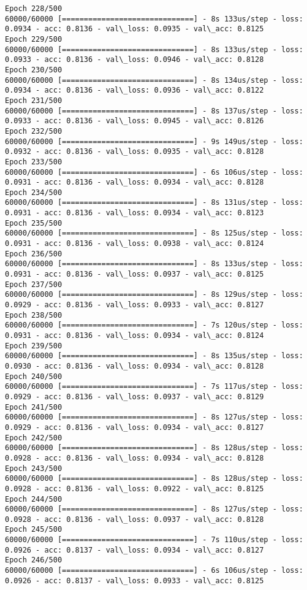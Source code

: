 \documentclass[11pt]{article}
\begin{document}
\begin{Verbatim}[commandchars=\\\{\}]
Epoch 228/500
60000/60000 [==============================] - 8s 133us/step - loss: 0.0934 - acc: 0.8136 - val\_loss: 0.0935 - val\_acc: 0.8125
Epoch 229/500
60000/60000 [==============================] - 8s 133us/step - loss: 0.0933 - acc: 0.8136 - val\_loss: 0.0946 - val\_acc: 0.8128
Epoch 230/500
60000/60000 [==============================] - 8s 134us/step - loss: 0.0934 - acc: 0.8136 - val\_loss: 0.0936 - val\_acc: 0.8122
Epoch 231/500
60000/60000 [==============================] - 8s 137us/step - loss: 0.0933 - acc: 0.8136 - val\_loss: 0.0945 - val\_acc: 0.8126
Epoch 232/500
60000/60000 [==============================] - 9s 149us/step - loss: 0.0932 - acc: 0.8136 - val\_loss: 0.0935 - val\_acc: 0.8128
Epoch 233/500
60000/60000 [==============================] - 6s 106us/step - loss: 0.0931 - acc: 0.8136 - val\_loss: 0.0934 - val\_acc: 0.8128
Epoch 234/500
60000/60000 [==============================] - 8s 131us/step - loss: 0.0931 - acc: 0.8136 - val\_loss: 0.0934 - val\_acc: 0.8123
Epoch 235/500
60000/60000 [==============================] - 8s 125us/step - loss: 0.0931 - acc: 0.8136 - val\_loss: 0.0938 - val\_acc: 0.8124
Epoch 236/500
60000/60000 [==============================] - 8s 133us/step - loss: 0.0931 - acc: 0.8136 - val\_loss: 0.0937 - val\_acc: 0.8125
Epoch 237/500
60000/60000 [==============================] - 8s 129us/step - loss: 0.0929 - acc: 0.8136 - val\_loss: 0.0933 - val\_acc: 0.8127
Epoch 238/500
60000/60000 [==============================] - 7s 120us/step - loss: 0.0931 - acc: 0.8136 - val\_loss: 0.0934 - val\_acc: 0.8124
Epoch 239/500
60000/60000 [==============================] - 8s 135us/step - loss: 0.0930 - acc: 0.8136 - val\_loss: 0.0934 - val\_acc: 0.8128
Epoch 240/500
60000/60000 [==============================] - 7s 117us/step - loss: 0.0929 - acc: 0.8136 - val\_loss: 0.0937 - val\_acc: 0.8129
Epoch 241/500
60000/60000 [==============================] - 8s 127us/step - loss: 0.0929 - acc: 0.8136 - val\_loss: 0.0934 - val\_acc: 0.8127
Epoch 242/500
60000/60000 [==============================] - 8s 128us/step - loss: 0.0928 - acc: 0.8136 - val\_loss: 0.0934 - val\_acc: 0.8128
Epoch 243/500
60000/60000 [==============================] - 8s 128us/step - loss: 0.0928 - acc: 0.8136 - val\_loss: 0.0922 - val\_acc: 0.8125
Epoch 244/500
60000/60000 [==============================] - 8s 127us/step - loss: 0.0928 - acc: 0.8136 - val\_loss: 0.0937 - val\_acc: 0.8128
Epoch 245/500
60000/60000 [==============================] - 7s 110us/step - loss: 0.0926 - acc: 0.8137 - val\_loss: 0.0934 - val\_acc: 0.8127
Epoch 246/500
60000/60000 [==============================] - 6s 106us/step - loss: 0.0926 - acc: 0.8137 - val\_loss: 0.0933 - val\_acc: 0.8125

\end{Verbatim}
\end{document}
